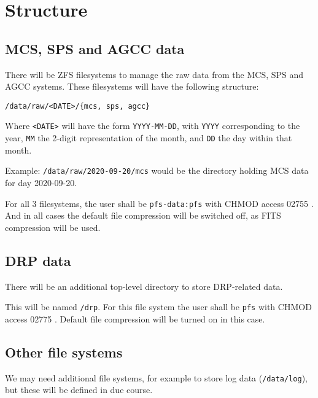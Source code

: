 \section{Structure}

\subsection{MCS, SPS and AGCC data}

There will be ZFS filesystems to manage the raw data from the MCS, SPS and AGCC systems.
These filesystems will have the following structure:

\begin{verbatim}
/data/raw/<DATE>/{mcs, sps, agcc}
\end{verbatim}

Where \verb!<DATE>! will have the form \verb!YYYY-MM-DD!, with \verb!YYYY! corresponding to the year,
\verb!MM! the 2-digit representation of the month, and \verb!DD! the day within that month.

Example: \verb!/data/raw/2020-09-20/mcs! would be the directory holding MCS data for day 2020-09-20.

For all 3 filesystems, the user shall be \verb!pfs-data:pfs! with CHMOD access 02755 . 
And in all cases the default file compression will be switched off, as FITS compression will be used.  

\subsection{DRP data}

There will be an additional top-level directory to store DRP-related data. 

This will be named
\verb!/drp!. 
For this file system the user shall be \verb!pfs! with CHMOD access 02775 . 
Default file compression will be turned on in this case.


\subsection{Other file systems}

We may need additional file systems, for example to store log data (\verb!/data/log!), but these will be defined
in due course.
